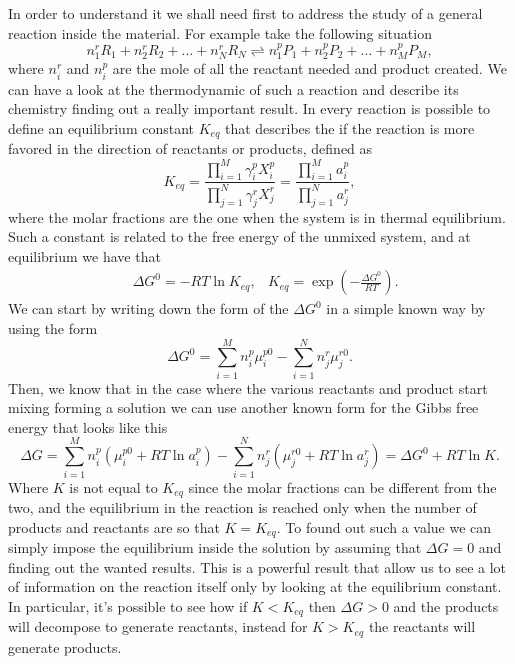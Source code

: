 In order to understand it we shall need first to address the study of a general reaction inside the material. For example take the following situation
\begin{equation}
    n_1^r R_1 + n_2^rR_2 + \dots + n_N^rR_N \rightleftharpoons n_1^p P_1 + n_2^pP_2 + \dots + n_M^pP_M,
\end{equation}
where $n^r_i$ and $n^p_i$ are the mole of all the reactant needed and product created. We can have a look at the thermodynamic of such a reaction and describe its chemistry finding out a really important result.
{
    In every reaction is possible to define an equilibrium constant $K_{eq}$ that describes the if the reaction is more favored in the direction of reactants or products, defined as
    \begin{equation}
        K_{eq} = \frac{\prod_{i=1}^M \gamma_i^p X_i^p}{\prod_{j=1}^N \gamma_j^r X_j^r} = \frac{\prod_{i=1}^M a_i^p}{\prod_{j=1}^N a_j^r},
    \end{equation}
    where the molar fractions are the one when the system is in thermal equilibrium. Such a constant is related to the free energy of the unmixed system, and at equilibrium we have that 
    \begin{align}
        &\Delta G^0 = -RT\ln K_{eq}, &K_{eq} = \exp\left( -\frac{\Delta G^0}{RT} \right).
    \end{align}
}
{
    We can start by writing down the form of the $\Delta G^0$ in a simple known way by using the form
    \begin{equation}
        \Delta G^0 = \sum_{i=1}^M n_i^p\mu_{i}^{p0} - \sum_{i=1}^N n_j^r\mu_{j}^{r0}.
    \end{equation}
    Then, we know that in the case where the various reactants and product start mixing forming a solution we can use another known form for the Gibbs free energy that looks like this
    \begin{equation}
        \Delta G = \sum_{i=1}^M n_i^p\left( \mu_{i}^{p0} + RT\ln a_i^p \right) - \sum_{i=1}^N n_j^r\left( \mu_{j}^{r0} + RT\ln a_j^r \right) = \Delta G^0 + RT \ln K.
    \end{equation}
    Where $K$ is not equal to $K_{eq}$ since the molar fractions can be different from the two, and the equilibrium in the reaction is reached only when the number of products and reactants are so that $K = K_{eq}$. To found out such a value we can simply impose the equilibrium inside the solution by assuming that $\Delta G = 0$ and finding out the wanted results.
}
\noindent
This is a powerful result that allow us to see a lot of information on the reaction itself only by looking at the equilibrium constant. In particular, it's possible to see how if $K < K_{eq}$ then $\Delta G > 0$ and the products will decompose to generate reactants, instead for $K > K_{eq}$ the reactants will generate products.

